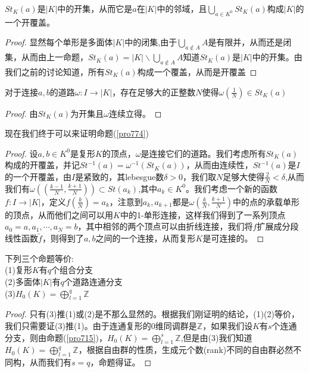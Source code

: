 \begin{corollary}\label{cor_1_788}
$St_{K}(a)$是$|K|$中的开集，从而它是$a$在$|K|$中的邻域，且$\bigcup\limits_{a\in K^{0}}St_{K}(a)$构成$|K|$的一个开覆盖。
\end{corollary}
\begin{proof}
显然每个单形是多面体$|K|$中的闭集,由于$\bigcup\limits_{a\notin A}A$是有限并，从而还是闭集，从而由上一命题，$St_{K}(a)=|K|\backslash\bigcup\limits_{a\notin A}A$知道$St_{K}(a)$是$|K|$中的开集。由我们之前的讨论知道，所有$St_{K}(a)$构成一个覆盖，从而是开覆盖
\end{proof}
\begin{corollary}
对于连接$a,b$的道路$\omega:I\rightarrow|K|$，存在足够大的正整数$N$使得$\omega(\frac{1}{N})\in St_{K}(a)$
\end{corollary}
\begin{proof}
由$St_{K}(a)$为开集且$\omega$连续立得。
\end{proof}
现在我们终于可以来证明命题(\ref{pro774})
\begin{proof}
设$a,b\in K^{0}$是复形$K$的顶点，$\omega$是连接它们的道路。我们考虑所有$St_{K}(a)$构成的开覆盖，并记$St^{-1}(a)=\omega^{-1}(St_{K}(a))$，从而由连续性，$St^{-1}(a)$是$I$的一个开覆盖，由$I$是紧致的，其lebesgue数$\delta>0$，我们取$N$足够大使得$\frac{2}{N}<\delta$,从而我们有$\omega((\frac{k-1}{N},\frac{k+1}{N}))\subset St(a_{k})$,其中$a_{k}\in K^{0}$。我们考虑一个新的函数$f:I\rightarrow |K|$，定义$f(\frac{k}{N})=a_{k}$，注意到$a_{k},a_{k+1}$都是$\omega(\frac{k}{N},\frac{k+1}{N})$中的点的承载单形的顶点，从而他们之间可以用$K$中的1-单形连接，这样我们得到了一系列顶点$a_{0}=a,a_{1},\cdots,a_{N}=b$，其中相邻的两个顶点可以由折线连接，我们将$f$扩展成分段线性函数$\tilde{f}$，则得到了$a,b$之间的一个连接，从而复形$K$是可连接的。
\end{proof}
\begin{corollary}
下列三个命题等价:\\
(1)复形$K$有$q$个组合分支\\
(2)多面体$|K|$有$q$个道路连通分支\\
(3)$H_{0}(K)=\bigoplus\limits_{l=1}^{q}\mathbb{Z}$
\end{corollary}
\begin{proof}
只有(3)推(1)或(2)是不那么显然的。根据我们刚证明的结论，(1)(2)等价，我们只需要证(3)推(1)。由于连通复形的0维同调群是$\mathbb{Z}$，如果我们设$K$有$s$个连通分支，则由命题(\ref{pro715})，$H_{0}(K)=\bigoplus\limits_{l=1}^{s}\mathbb{Z}$,但是由(3)我们知道$H_{0}(K)=\bigoplus\limits_{l=1}^{q}\mathbb{Z}$，根据自由群的性质，生成元个数(rank)不同的自由群必然不同构，从而我们有$s=q$，命题得证。
\end{proof}
